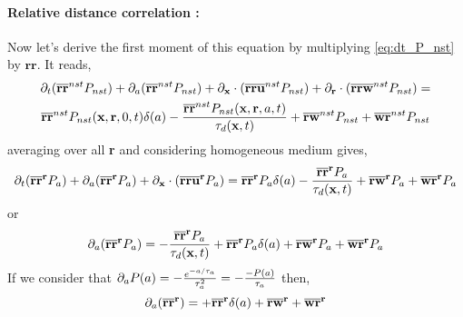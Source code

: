 \paragraph{Relative distance correlation :}
Now let's derive the first moment of this equation by multiplying \ref{eq:dt_P_nst} by $\textbf{rr}$. 
It reads, 
\begin{multline}
    \partial_t (\overline{\textbf{rr}}^{nst} P_{nst})
    + \partial_a (\overline{\textbf{rr}}^{nst} P_{nst})
    + \partial_{\textbf{x}} \cdot (\overline{\textbf{rr}\textbf{u} }^{nst} P_{nst})
    + \partial_{\textbf{r}}  \cdot (\overline{\textbf{rr}\textbf{w}}^{nst} P_{nst})
    =  \\
    \overline{\textbf{rr}}^{nst} P_{nst}(\textbf{x},\textbf{r},0,t)\delta(a)
    -  \frac{\overline{\textbf{rr}}^{nst} P_{nst}(\textbf{x},\textbf{r},a,t)}{\tau_d(\textbf{x},t)}
    + \overline{\textbf{rw}}^{nst}P_{nst}
    + \overline{\textbf{wr}}^{nst}P_{nst}
\end{multline}
averaging over all \textbf{r} and considering homogeneous medium gives,
\begin{equation*}
    \partial_t (\overline{\textbf{rr}}^{\textbf{r}} P_{a})
    + \partial_a (\overline{\textbf{rr}}^{\textbf{r}} P_{a})
    + \partial_{\textbf{x}} \cdot (\overline{\textbf{rr}\textbf{u} }^{\textbf{r}} P_{a})
    =  
    \overline{\textbf{rr}}^{\textbf{r}} P_{a}\delta(a)
    -  \frac{\overline{\textbf{rr}}^{\textbf{r}} P_{a}}{\tau_d(\textbf{x},t)}
    + \overline{\textbf{rw}}^{\textbf{r}} P_{a}
    + \overline{\textbf{wr}}^{\textbf{r}} P_{a}
\end{equation*}
or 
\begin{equation*}
    \partial_a (\overline{\textbf{rr}}^{\textbf{r}} P_{a})
    =  
    -  \frac{\overline{\textbf{rr}}^{\textbf{r}} P_{a}}{\tau_d(\textbf{x},t)}
    + \overline{\textbf{rr}}^{\textbf{r}} P_{a}\delta(a)
    + \overline{\textbf{rw}}^{\textbf{r}} P_{a}
    + \overline{\textbf{wr}}^{\textbf{r}} P_{a}
\end{equation*}
If we consider that $\partial_a P(a) = - \frac{e^{-a/\tau_a}}{\tau_a^2} = - \frac{- P(a)}{\tau_a}$ then, 
\begin{equation*}
     \partial_a (\overline{\textbf{rr}}^{\textbf{r}})
    =  
    + \overline{\textbf{rr}}^{\textbf{r}} \delta(a)
    + \overline{\textbf{rw}}^{\textbf{r}} 
    + \overline{\textbf{wr}}^{\textbf{r}} 
\end{equation*}
